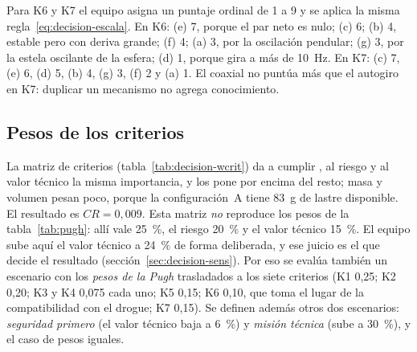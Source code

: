Para K6 y K7 el equipo asigna un puntaje ordinal de 1 a 9 y se aplica la misma
regla~\eqref{eq:decision-escala}. En K6: (e) 7, porque el par neto es nulo; (c) 6;
(b) 4, estable pero con deriva grande; (f) 4; (a) 3, por la oscilación pendular;
(g) 3, por la estela oscilante de la esfera; (d) 1, porque gira a más de \SI{10}{Hz}. En
K7: (c) 7, (e) 6, (d) 5, (b) 4, (g) 3, (f) 2 y (a) 1. El coaxial no puntúa más que el
autogiro en K7: duplicar un mecanismo no agrega conocimiento.

\subsection{Pesos de los criterios}
La matriz de criterios (tabla~\ref{tab:decision-wcrit}) da a cumplir , al
riesgo y al valor técnico la misma importancia, y los pone por encima del resto; masa y
volumen pesan poco, porque la configuración~A tiene \SI{83}{g} de lastre disponible. El
resultado es $CR=0{,}009$. Esta matriz \emph{no} reproduce los pesos de la
tabla~\ref{tab:pugh}: allí  vale \SI{25}{\percent}, el riesgo \SI{20}{\percent} y
el valor técnico \SI{15}{\percent}. El equipo sube aquí el valor técnico a
\SI{24}{\percent} de forma deliberada, y ese juicio es el que decide el resultado
(sección~\ref{sec:decision-sens}). Por eso se evalúa también un escenario con los
\emph{pesos de la Pugh} trasladados a los siete criterios (K1 0,25; K2 0,20; K3 y K4
0,075 cada uno; K5 0,15; K6 0,10, que toma el lugar de la compatibilidad con el drogue;
K7 0,15). Se definen además otros dos escenarios: \emph{seguridad
primero} (el valor técnico baja a \SI{6}{\percent}) y \emph{misión técnica} (sube a
\SI{30}{\percent}), y el caso de pesos iguales.

